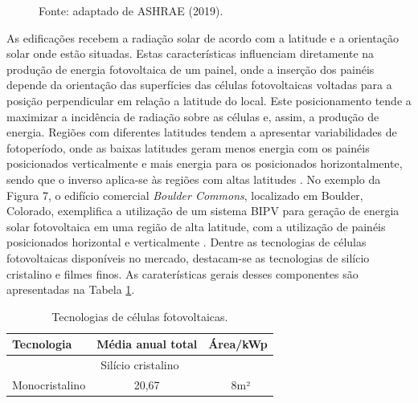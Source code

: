 \begin{onehalfspace}
\begin{figure}[H]
            \begin{flushleft}
                \par \small Fonte: adaptado de ASHRAE (2019).
            \end{flushleft}
            \label{Figura 6}
        \end{figure}\vspace*{-0.4cm}

\noindent As edificações recebem a radiação solar de acordo com a latitude e a orientação solar onde estão situadas. Estas características influenciam diretamente na produção de energia fotovoltaica de um painel, onde a inserção dos painéis depende da orientação das superfícies das células fotovoltaicas voltadas para a posição perpendicular em relação a latitude do local. Este posicionamento tende a maximizar a incidência de radiação sobre as células e, assim, a produção de energia. Regiões com diferentes latitudes tendem a apresentar variabilidades de fotoperíodo, onde as baixas latitudes geram menos energia com os painéis posicionados verticalmente e mais energia para os posicionados horizontalmente, sendo que o inverso aplica-se às regiões com altas latitudes \cite{Pereira2017}.\vspace{0.3cm} \newline
No exemplo da Figura 7, o edifício comercial \textit{Boulder Commons}, localizado em Boulder, Colorado, exemplifica a utilização de um sistema BIPV para geração de energia solar fotovoltaica em uma região de alta latitude, com a utilização de painéis posicionados horizontal e verticalmente \cite{AmericanSocietyofHeatingRefrigeratingandAir-ConditioningEngineers-ASHRAE2019,Pereira2017}. Dentre as tecnologias de células fotovoltaicas disponíveis no mercado, destacam-se as tecnologias de silício cristalino e filmes finos. As caraterísticas gerais desses componentes são apresentadas na Tabela \ref{tab:tabela1}.
        \begin{table}[ht]\centering
            \caption{\small Tecnologias de células fotovoltaicas.}
            \vspace*{0.2cm}
            \label{tab:tabela1}
            \begin{tabular}{lcc}
            \hline
            \textbf{Tecnologia}                     & \textbf{Média anual total}    & \textbf{Área/kWp} \\ \hline
            \multicolumn{3}{c}{Silício cristalino}                                                    \\ \hline
            Monocristalino                          & 20,67                         & ~8m²              \\ \hline

\end{tabular}
\end{table}
\end{onehalfspace}
